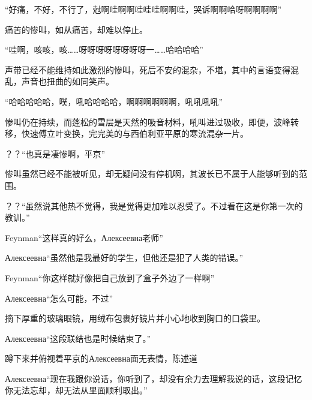 \documentclass{article}
\begin{document}









“好痛，不好，不行了，尅啊哇啊啊哇哇哇啊啊哇，哭诉啊啊哈呀啊啊啊啊”

痛苦的惨叫，如从痛苦，却难以停止。

“哇啊，咳咳，咳……呀呀呀呀呀呀呀呀一……哈哈哈哈”

声带已经不能维持如此激烈的惨叫，死后不安的混杂，不堪，其中的言语变得混乱，声音也扭曲的如同笑声。

“哈哈哈哈哈，噗，吼哈哈哈哈，啊啊啊啊啊啊，吼吼吼吼”

惨叫仍在持续，而蓬松的雪层是天然的吸音材料，吼叫进过吸收，即便，波峰转移，快速傅立叶变换，完完美的与西伯利亚平原的寒流混杂一片。

？？“也真是凄惨啊，平京”

惨叫虽然已经不能被听见，却无疑问没有停机啊，其波长已不属于人能够听到的范围。

？？“虽然说其他热不觉得，我是觉得更加难以忍受了。不过看在这是你第一次的教训。”

Feynman“这样真的好么，Алексеевна老师”

Алексеевна“虽然他是我最好的学生，但他还是犯了人类的错误。”

Feynman“你这样就好像把自己放到了盒子外边了一样啊”

Алексеевна“怎么可能，不过”

摘下厚重的玻璃眼镜，用绒布包裹好镜片并小心地收到胸口的口袋里。

Алексеевна“这段联结也是时候结束了。”

蹲下来并俯视着平京的Алексеевна面无表情，陈述道

Алексеевна“现在我跟你说话，你听到了，却没有余力去理解我说的话，这段记忆你无法忘却，却无法从里面顺利取出。”
\end{document}
